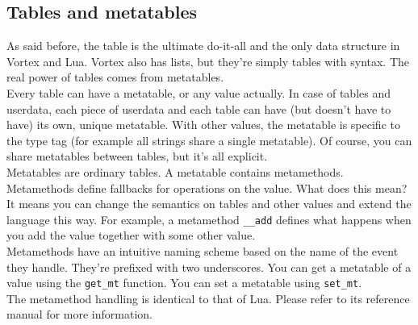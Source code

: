 \documentclass{article}
\begin{document}
\subsection{Tables and metatables}
As said before, the table is the ultimate do-it-all and the only data structure
in Vortex and Lua. Vortex also has lists, but they're simply tables with
syntax. The real power of tables comes from metatables.\\
Every table can have a metatable, or any value actually. In case of tables
and userdata, each piece of userdata and each table can have (but doesn't
have to have) its own, unique metatable. With other values, the metatable
is specific to the type tag (for example all strings share a single
metatable). Of course, you can share metatables between tables, but
it's all explicit.\\
Metatables are ordinary tables. A metatable contains metamethods. Metamethods
define fallbacks for operations on the value. What does this mean? It means
you can change the semantics on tables and other values and extend the
language this way. For example, a metamethod \verb|__add| defines
what happens when you add the value together with some other value.\\
Metamethods have an intuitive naming scheme based on the name of the event
they handle. They're prefixed with two underscores. You can get a metatable
of a value using the \verb|get_mt| function. You can set a metatable using
\verb|set_mt|.\\
The metamethod handling is identical to that of Lua. Please refer to its
reference manual for more information.
\end{document}
